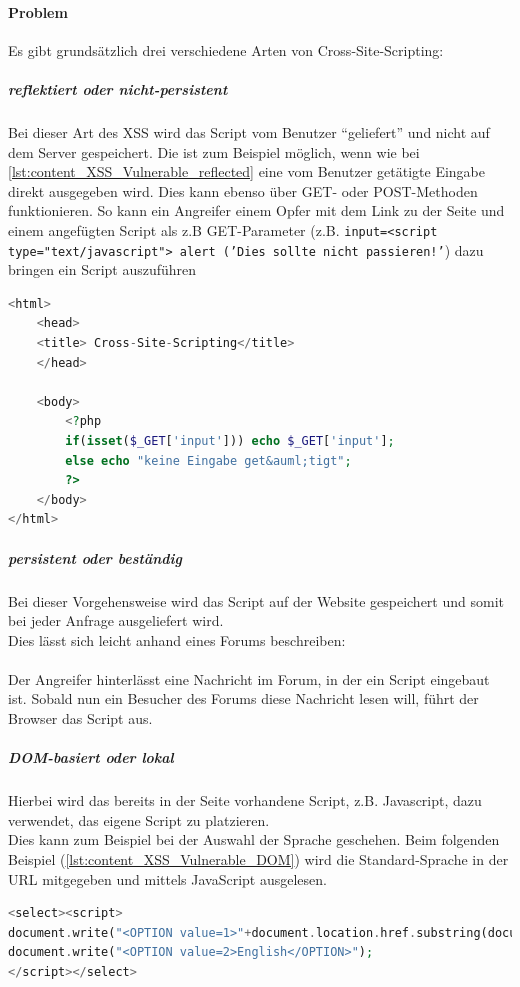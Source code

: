 \paragraph{Problem}
Es gibt grundsätzlich drei verschiedene Arten von Cross-Site-Scripting:
\subparagraph{reflektiert oder nicht-persistent}
Bei dieser Art des XSS wird das Script vom Benutzer \enquote{geliefert} und nicht auf dem Server gespeichert. Die ist zum Beispiel möglich, wenn wie bei \autoref{lst:content_XSS_Vulnerable_reflected} eine vom Benutzer getätigte Eingabe direkt ausgegeben wird. Dies kann ebenso über GET- oder POST-Methoden funktionieren. So kann ein Angreifer einem Opfer mit dem Link zu der Seite und einem angefügten Script als z.B GET-Parameter (z.B. \texttt{input=<script type="text/javascript"> alert ('Dies sollte nicht passieren!'}) dazu bringen ein Script auszuführen
\begin{lstlisting}[style=custom, language=PHP, caption={ reflektiertes Cross-Site-Scripting Anfällig},label={lst:content_XSS_Vulnerable_reflected}]
<html>
	<head>
	<title> Cross-Site-Scripting</title>
	</head>

	<body>
		<?php
		if(isset($_GET['input'])) echo $_GET['input'];
		else echo "keine Eingabe get&auml;tigt";			
		?>
	</body>
</html>
\end{lstlisting}
\subparagraph{persistent oder beständig}
Bei dieser Vorgehensweise wird das Script auf der Website gespeichert und somit bei jeder Anfrage ausgeliefert wird. \\ Dies lässt sich leicht anhand eines Forums beschreiben:\\\\
Der Angreifer hinterlässt eine Nachricht im Forum, in der ein Script eingebaut ist. Sobald nun ein Besucher des Forums diese Nachricht lesen will, führt der Browser das Script aus.
\subparagraph{DOM-basiert oder lokal}
Hierbei wird das bereits in der Seite vorhandene Script, z.B. Javascript, dazu verwendet, das eigene Script zu platzieren.\\
Dies kann zum Beispiel bei der Auswahl der Sprache geschehen. Beim folgenden Beispiel (\autoref{lst:content_XSS_Vulnerable_DOM}) wird die Standard-Sprache in der URL mitgegeben und mittels JavaScript ausgelesen.
\begin{lstlisting}[style=custom, language=PHP, caption={DOM-Cross-Site-Scripting Anfällig},label={lst:content_XSS_Vulnerable_DOM}]
<select><script>
document.write("<OPTION value=1>"+document.location.href.substring(document.location.href.indexOf("default=")+8)+"</OPTION>");
document.write("<OPTION value=2>English</OPTION>");
</script></select>
\end{lstlisting}

